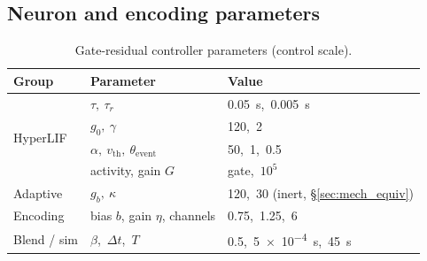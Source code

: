 \subsection{Neuron and encoding parameters}
\label{sec:mech_params}
\begin{table}[t]
\caption{Gate-residual controller parameters (control scale).}
\label{tab:mech_params}
\centering\small
\begin{tabular}{@{}lll@{}}
\toprule
Group & Parameter & Value \\
\midrule
\multirow{4}{*}{HyperLIF}
  & $\tau,\ \tau_r$ & \SI{0.05}{s},\ \SI{0.005}{s} \\
  & $g_0,\ \gamma$ & 120,\ 2 \\
  & $\alpha,\ v_\mathrm{th},\ \theta_\mathrm{event}$ & 50,\ 1,\ 0.5 \\
  & activity, gain $G$ & gate,\ $10^5$ \\
\midrule
Adaptive & $g_b,\ \kappa$ & 120,\ 30 (inert, \S\ref{sec:mech_equiv}) \\
\midrule
Encoding & bias $b$, gain $\eta$, channels & 0.75,\ 1.25,\ 6 \\
\midrule
Blend / sim & $\beta$,\ $\Delta t$,\ $T$ & 0.5,\ \SI{5e-4}{s},\ \SI{45}{s} \\
\bottomrule
\end{tabular}
\end{table}
